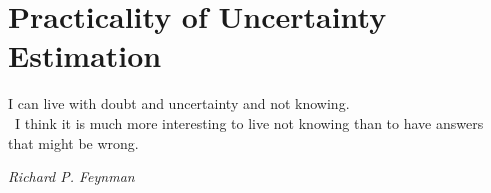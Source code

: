 \chapter{Practicality of Uncertainty Estimation}
\label{chap:practicality}

\epigraph{I can live with doubt and uncertainty and not knowing. \\ I think it is much more interesting to live not knowing than to have answers that might be wrong.}{\textit{Richard P. Feynman}}








